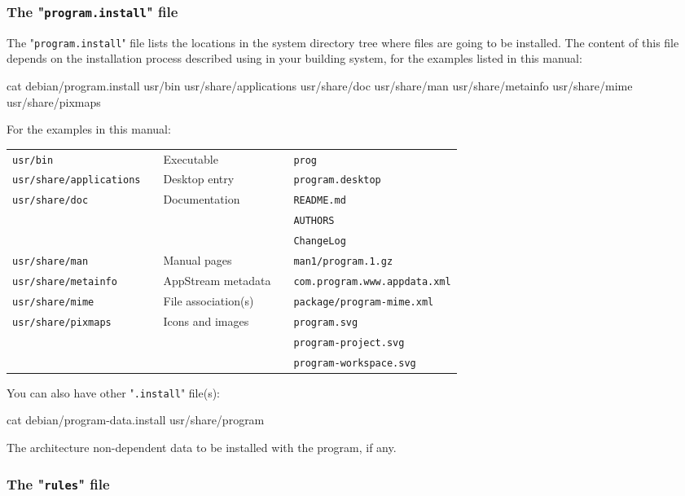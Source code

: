 \subsubsection{The "\texttt{program.install}" file}

The "\texttt{program.install}" file lists the locations in the system directory tree where files are going to be installed. 
The content of this file depends on the installation process described using in your building system, for the examples listed 
in this manual: 
\begin{script}
 cat debian/program.install
usr/bin
usr/share/applications
usr/share/doc
usr/share/man
usr/share/metainfo
usr/share/mime
usr/share/pixmaps
\end{script}
\noindent For the examples in this manual: \\[0.25cm]
\begin{tabular}{lp{0.25cm}lp{0.25cm}l}
\texttt{usr/bin} & & Executable & & \texttt{prog}\\
\texttt{usr/share/applications} & & Desktop entry & & \texttt{program.desktop} \\
\texttt{usr/share/doc} & & Documentation & & \texttt{README.md} \\
& & & & \texttt{AUTHORS} \\
& & & & \texttt{ChangeLog} \\
\texttt{usr/share/man} & & Manual pages & & \texttt{man1/program.1.gz} \\
\texttt{usr/share/metainfo} & & AppStream metadata & & \texttt{com.program.www.appdata.xml} \\
\texttt{usr/share/mime} & & File association(s) & & \texttt{package/program-mime.xml} \\
\texttt{usr/share/pixmaps} & & Icons and images & & \texttt{program.svg} \\
& & & & \texttt{program-project.svg} \\
& & & & \texttt{program-workspace.svg} \\
\end{tabular}
\noindent You can also have other "\texttt{.install}" file(s):
\begin{script}
 cat debian/program-data.install
usr/share/program
\end{script}
The architecture non-dependent data to be installed with the program, if any.

\subsubsection{The "\texttt{rules}" file}

